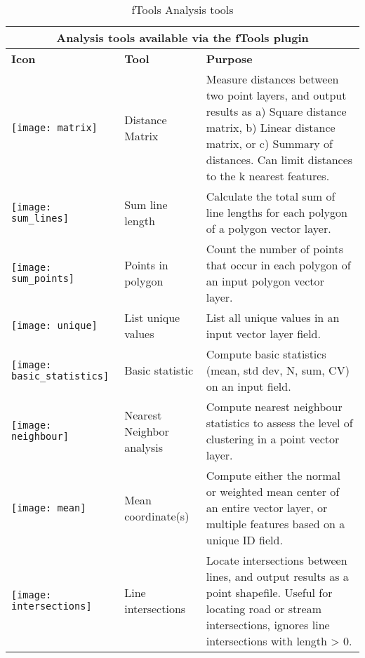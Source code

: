 \begin{table}[ht]
\centering
\caption{fTools Analysis tools}\label{tab:ftool_analysis}\medskip
 \begin{tabular}{|p{0.3in}|p{1.2in}|p{4.7in}|}
 \hline \multicolumn{3}{|c|}{\textbf{Analysis tools available via the fTools plugin}} \\
 \hline \textbf{Icon} & \textbf{Tool} & \textbf{Purpose} \\
 \hline \texttt{[image: matrix]} & Distance Matrix &
Measure distances between two point layers, and output results as a) Square
distance matrix, b) Linear distance matrix, or c) Summary of distances. Can
limit distances to the k nearest features. \\ 
 \hline \texttt{[image: sum\_lines]} & Sum line length & Calculate
the total sum of line lengths for each polygon of a polygon vector layer. \\
 \hline \texttt{[image: sum\_points]} & Points in polygon & Count
the number of points that occur in each polygon of an input polygon vector
layer. \\
 \hline \texttt{[image: unique]} & List unique values & List
all unique values in an input vector layer field. \\
 \hline \texttt{[image: basic\_statistics]} & Basic statistic & Compute
basic statistics (mean, std dev, N, sum, CV) on an input field. \\ 
 \hline \texttt{[image: neighbour]} & Nearest Neighbor analysis
& Compute nearest neighbour statistics to assess the level of clustering in a
point vector layer. \\
 \hline \texttt{[image: mean]} & Mean coordinate(s) &
Compute either the normal or weighted mean center of an entire vector layer,
or multiple features based on a unique ID field. \\ 
 \hline \texttt{[image: intersections]} & Line intersections &
Locate intersections between lines, and output results as a point shapefile.
Useful for locating road or stream intersections, ignores line intersections
with length > 0. \\
 \hline
\end{tabular}
\end{table}

